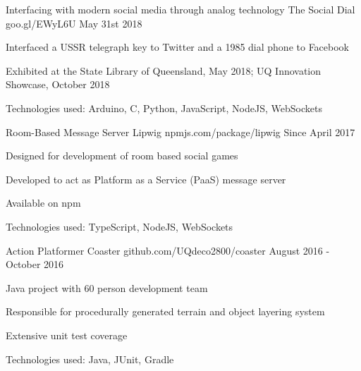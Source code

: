 


\begin{cventries}

\cventry
{Interfacing with modern social media through analog technology} %
{The Social Dial} %
{goo.gl/EWyL6U} %
{May 31st 2018} %
{ %
\begin{cvitems}
\item Interfaced a USSR telegraph key to Twitter and a 1985 dial phone to Facebook
\item Exhibited at the State Library of Queensland, May 2018; UQ Innovation Showcase, October 2018
\item Technologies used: Arduino, C, Python, JavaScript, NodeJS, WebSockets
\end{cvitems}
}

\cventry
{Room-Based Message Server} %
{Lipwig} %
{npmjs.com/package/lipwig} %
{Since April 2017} %
{ %
\begin{cvitems}
\item Designed for development of room based social games
\item Developed to act as Platform as a Service (PaaS) message server
\item Available on npm
\item Technologies used: TypeScript, NodeJS, WebSockets
\end{cvitems}
}


\cventry
{Action Platformer} %
{Coaster} %
{github.com/UQdeco2800/coaster} %
{August 2016 - October 2016} %
{ %
\begin{cvitems}
\item Java project with 60 person development team
\item Responsible for procedurally generated terrain and object layering system
\item Extensive unit test coverage
\item Technologies used: Java, JUnit, Gradle
\end{cvitems}
}


\end{cventries}
